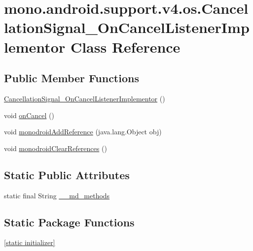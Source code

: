 \hypertarget{classmono_1_1android_1_1support_1_1v4_1_1os_1_1_cancellation_signal___on_cancel_listener_implementor}{
\section{mono.android.support.v4.os.CancellationSignal\_\-OnCancelListenerImplementor Class Reference}
\label{classmono_1_1android_1_1support_1_1v4_1_1os_1_1_cancellation_signal___on_cancel_listener_implementor}
}
\subsection*{Public Member Functions}
\begin{CompactItemize}
\item 
\hyperlink{classmono_1_1android_1_1support_1_1v4_1_1os_1_1_cancellation_signal___on_cancel_listener_implementor_d8833421059b8edadb0944e0e3963a24}{CancellationSignal\_\-OnCancelListenerImplementor} ()
\item 
void \hyperlink{classmono_1_1android_1_1support_1_1v4_1_1os_1_1_cancellation_signal___on_cancel_listener_implementor_14a9b4bed965f010e2120c2eb10e68af}{onCancel} ()
\item 
void \hyperlink{classmono_1_1android_1_1support_1_1v4_1_1os_1_1_cancellation_signal___on_cancel_listener_implementor_1d777c1a6c121dac15f3b673e277fc82}{monodroidAddReference} (java.lang.Object obj)
\item 
void \hyperlink{classmono_1_1android_1_1support_1_1v4_1_1os_1_1_cancellation_signal___on_cancel_listener_implementor_2f6d27789484ee49837d8ebf4dd88e5e}{monodroidClearReferences} ()
\end{CompactItemize}
\subsection*{Static Public Attributes}
\begin{CompactItemize}
\item 
static final String \hyperlink{classmono_1_1android_1_1support_1_1v4_1_1os_1_1_cancellation_signal___on_cancel_listener_implementor_5eec9005f7084d8e489ea6fbe475df40}{\_\-\_\-md\_\-methods}
\end{CompactItemize}
\subsection*{Static Package Functions}
\begin{CompactItemize}
\item 
\hyperlink{classmono_1_1android_1_1support_1_1v4_1_1os_1_1_cancellation_signal___on_cancel_listener_implementor_5bb978b8037ffba5d863880bb4fee591}{\mbox{[}static initializer\mbox{]}}
\end{CompactItemize}

